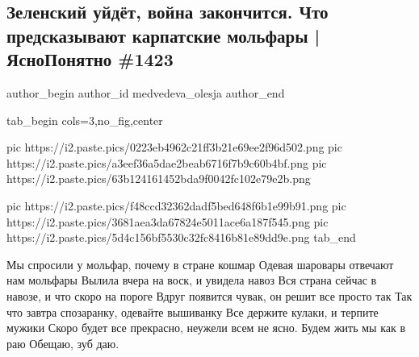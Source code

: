  
 
 
 
 
\subsection{Зеленский уйдёт, война закончится. Что предсказывают карпатские мольфары | ЯсноПонятно \#1423}
\label{sec:06_12_2021.youtube.medvedeva_olesja.1.molfary}


\ifcmt
 author_begin
   author_id medvedeva_olesja
 author_end
\fi

\ifcmt
tab_begin cols=3,no_fig,center

  pic https://i2.paste.pics/0223eb4962c21ff3b21e69ee2f96d502.png
	pic https://i2.paste.pics/a3eef36a5dae2beab6716f7b9c60b4bf.png
	pic https://i2.paste.pics/63b124161452bda9f0042fc102e79e2b.png

	pic https://i2.paste.pics/f48ccd32362dadf5bed648f6b1e99b91.png
	pic https://i2.paste.pics/3681aea3da67824e5011ace6a187f545.png
	pic https://i2.paste.pics/5d4c156bf5530c32fc8416b81e89dd9e.png
tab_end
\fi

\begin{cmtfront}
\begin{center}
	

\obeycr
Мы спросили у мольфар, почему в стране кошмар
Одевая шаровары отвечают нам мольфары 
Вылила вчера на воск, и увидела навоз 
Вся страна сейчас в навозе, и что скоро на пороге
Вдруг появится чувак, он решит все просто так
Так что завтра спозаранку, одевайте вышиванку 
Все держите кулаки, и терпите мужики
Скоро будет все прекрасно, неужели всем не ясно. 
Будем жить мы как в раю 
Обещаю, зуб даю.
\restorecr

\end{center}
\end{cmtfront}


